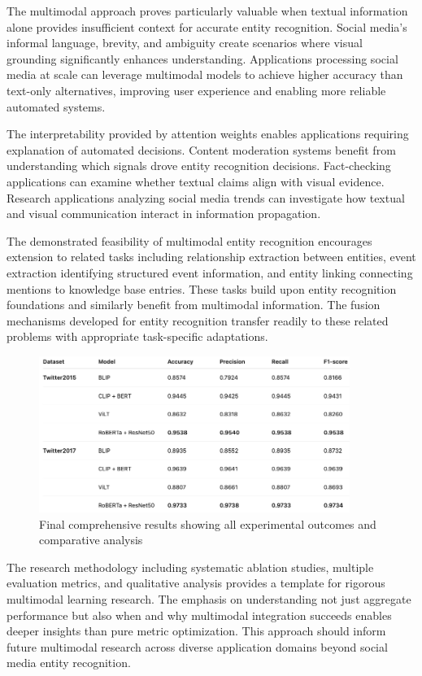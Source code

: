 \documentclass[12pt,a4paper]{report}
\begin{document}
The multimodal approach proves particularly valuable when textual information alone provides insufficient context for accurate entity recognition. Social media's informal language, brevity, and ambiguity create scenarios where visual grounding significantly enhances understanding. Applications processing social media at scale can leverage multimodal models to achieve higher accuracy than text-only alternatives, improving user experience and enabling more reliable automated systems.

The interpretability provided by attention weights enables applications requiring explanation of automated decisions. Content moderation systems benefit from understanding which signals drove entity recognition decisions. Fact-checking applications can examine whether textual claims align with visual evidence. Research applications analyzing social media trends can investigate how textual and visual communication interact in information propagation.

The demonstrated feasibility of multimodal entity recognition encourages extension to related tasks including relationship extraction between entities, event extraction identifying structured event information, and entity linking connecting mentions to knowledge base entries. These tasks build upon entity recognition foundations and similarly benefit from multimodal information. The fusion mechanisms developed for entity recognition transfer readily to these related problems with appropriate task-specific adaptations.

\begin{figure}[H]
\centering
\includegraphics[width=0.9\textwidth]{final result .png}
\caption{Final comprehensive results showing all experimental outcomes and comparative analysis}
\label{fig:final_results}
\end{figure}

The research methodology including systematic ablation studies, multiple evaluation metrics, and qualitative analysis provides a template for rigorous multimodal learning research. The emphasis on understanding not just aggregate performance but also when and why multimodal integration succeeds enables deeper insights than pure metric optimization. This approach should inform future multimodal research across diverse application domains beyond social media entity recognition.
\end{document}
